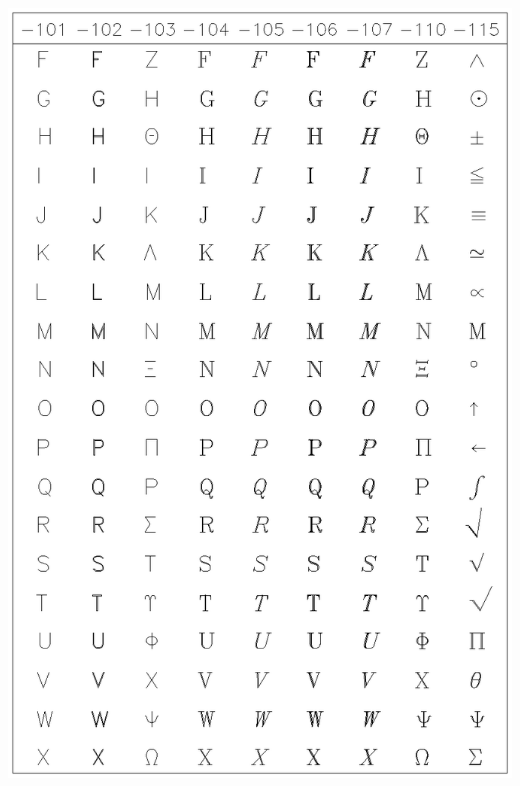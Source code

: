 \documentclass[11pt]{article}
\begin{document}
\includegraphics[height=0.95\textheight]{sun83-c3.eps}
\end{document}
